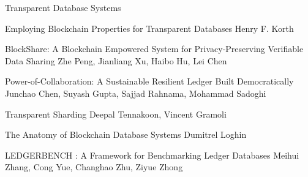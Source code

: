 \documentclass[11pt]{article}
\begin{document}
\begin{bulletin}
\begin{articlesection}{Transparent Database Systems}

\begin{article}
{Employing Blockchain Properties for Transparent Databases}
{Henry F. Korth}
\graphicspath{{submissions/korth/}}

\end{article}


\begin{article}
{BlockShare: A Blockchain Empowered System for Privacy-Preserving Verifiable Data Sharing}
{Zhe Peng, Jianliang Xu, Haibo Hu, Lei Chen}
\graphicspath{{submissions/peng/}}

\end{article}



\begin{article}
{Power-of-Collaboration: A Sustainable Resilient Ledger Built Democratically}
{Junchao Chen, Suyash Gupta, Sajjad Rahnama, Mohammad Sadoghi}
\graphicspath{{submissions/junchao/}}

\end{article}

\makeatletter
\renewcommand{\AB@affillist}{}
\renewcommand{\AB@authlist}{}
\setcounter{authors}{0}
\makeatother


\begin{article}
{Transparent Sharding}
{Deepal Tennakoon, Vincent Gramoli}
\graphicspath{{submissions/tennakoon/}}

\end{article}

\makeatletter
\renewcommand{\AB@affillist}{}
\renewcommand{\AB@authlist}{}
\setcounter{authors}{0}
\makeatother


\begin{article}
{The Anatomy of Blockchain Database Systems}
{Dumitrel Loghin}
\graphicspath{{submissions/dumi/}}

\end{article}

\makeatletter
\renewcommand{\AB@affillist}{}
\renewcommand{\AB@authlist}{}
\setcounter{authors}{0}
\makeatother

\begin{article}
{LEDGERBENCH : A Framework for Benchmarking Ledger
	Databases}
{Meihui Zhang, Cong Yue, Changhao Zhu, Ziyue Zhong}
\graphicspath{{submissions/meihui/}}

\end{article}


\end{articlesection}
\end{bulletin}
\end{document}
